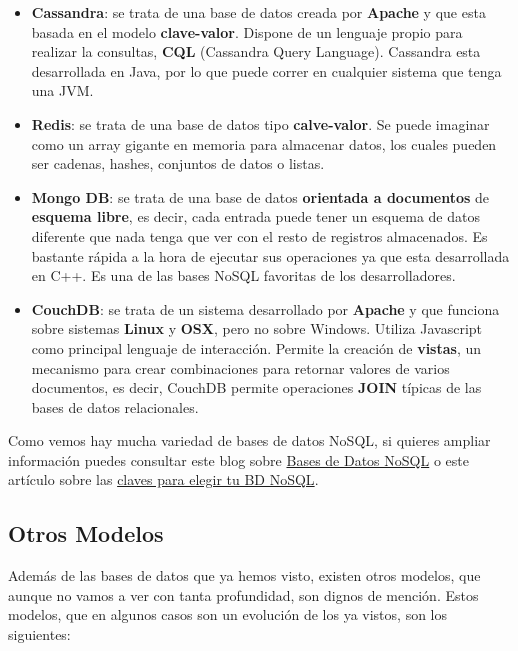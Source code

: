 \begin{itemize}
    \item \textbf{Cassandra}: se trata de una base de datos creada por \textbf{Apache} y que esta basada en el modelo \textbf{clave-valor}. Dispone de un lenguaje propio para realizar la consultas, \textbf{CQL} (Cassandra Query Language). Cassandra esta desarrollada en Java, por lo que puede correr en cualquier sistema que tenga una JVM.

    \item \textbf{Redis}: se trata de una base de datos tipo \textbf{calve-valor}. Se puede imaginar como un array gigante en memoria para almacenar datos, los cuales pueden ser cadenas, hashes, conjuntos de datos o listas.

    \item \textbf{Mongo DB}: se trata de una base de datos \textbf{orientada a documentos} de \textbf{esquema libre}, es decir, cada entrada puede tener un esquema de datos diferente que nada tenga que ver con el resto de registros almacenados. Es bastante rápida a la hora de ejecutar sus operaciones ya que esta desarrollada en C++. Es una de las bases NoSQL favoritas de los desarrolladores.

    \item \textbf{CouchDB}: se trata de un sistema desarrollado por \textbf{Apache} y que funciona sobre sistemas \textbf{Linux} y \textbf{OSX}, pero no sobre Windows. Utiliza Javascript como principal lenguaje de interacción. Permite la creación de \textbf{vistas}, un mecanismo para crear combinaciones para retornar valores de varios documentos, es decir, CouchDB permite operaciones \textbf{JOIN} típicas de las bases de datos relacionales.
\end{itemize}

Como vemos hay mucha variedad de bases de datos NoSQL, si quieres ampliar información puedes consultar este blog sobre \href{http://basesdedatosnosql.blogspot.com/}{Bases de Datos NoSQL} o este artículo sobre las \href{https://www.ondho.com/claves-para-elegir-tu-base-de-datos-nosql/}{claves para elegir tu BD NoSQL}.


\subsection{Otros Modelos}
Además de las bases de datos que ya hemos visto, existen otros modelos, que aunque no vamos a ver con tanta profundidad, son dignos de mención. Estos modelos, que en algunos casos son un evolución de los ya vistos, son los siguientes:

